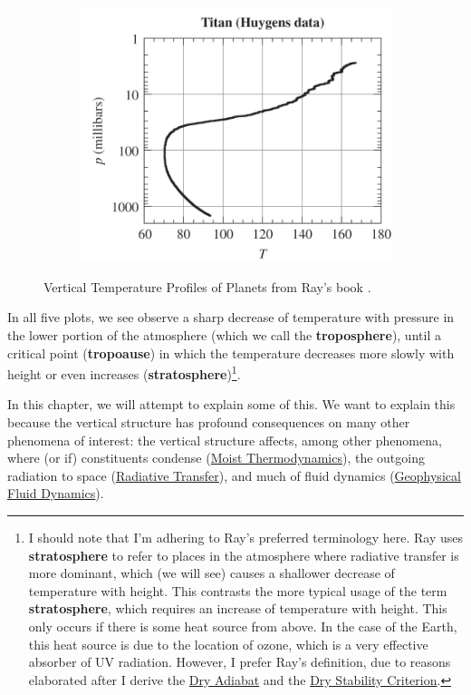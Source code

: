 \begin{figure}[H]
\begin{subfigure}[b]{0.3\linewidth}
        \includegraphics[width=\linewidth]{Figures/Thermodynamics/Titan Radiosonde.png}
    \end{subfigure}
    \caption{Vertical Temperature Profiles of Planets from Ray's book \cite{Ray}.}
\end{figure}

In all five plots, we see observe a sharp decrease of temperature with pressure in the lower portion of the atmosphere (which we call the \textbf{troposphere}), until a critical point (\textbf{tropoause}) in which the temperature decreases more slowly with height or even increases (\textbf{stratosphere})\footnote{
    I should note that I'm adhering to Ray's preferred terminology here. Ray uses \textbf{stratosphere} to refer to places in the atmosphere where radiative transfer is more dominant, which (we will see) causes a shallower decrease of temperature with height. This contrasts the more typical usage of the term \textbf{stratosphere}, which requires an increase of temperature with height. This only occurs if there is some heat source from above. In the case of the Earth, this heat source is due to the location of ozone, which is a very effective absorber of UV radiation. However, I prefer Ray's definition, due to reasons elaborated after I derive the \hyperref[Dry Adiabat Box]{Dry Adiabat} and the \hyperref[Dry Stability Box]{Dry Stability Criterion}. 
}.

In this chapter, we will attempt to explain some of this. We want to explain this because the vertical structure has profound consequences on many other phenomena of interest: the vertical structure affects, among other phenomena, where (or if) constituents condense (\hyperref[Moist Thermodynamics]{Moist Thermodynamics}), the outgoing radiation to space (\hyperref[Radiative Transfer]{Radiative Transfer}), and much of fluid dynamics (\hyperref[Geophysical Fluid Dynamics]{Geophysical Fluid Dynamics}). 

